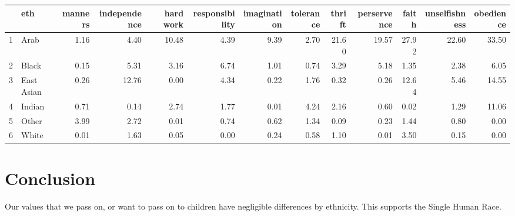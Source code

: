 \documentclass{amsart}
\begin{document}
\begin{landscape}
\begin{table}[ht]
\centering
\begin{tabular}{rlrrrrrrrrrrr}
  \hline
 & eth & manners & independence & hard work & responsibility & imagination & tolerance & thrift & perservence & faith & unselfishness & obedience \\ 
  \hline
1 & Arab & 1.16 & 4.40 & 10.48 & 4.39 & 9.39 & 2.70 & 21.60 & 19.57 & 27.92 & 22.60 & 33.50 \\ 
  2 & Black & 0.15 & 5.31 & 3.16 & 6.74 & 1.01 & 0.74 & 3.29 & 5.18 & 1.35 & 2.38 & 6.05 \\ 
  3 & East Asian & 0.26 & 12.76 & 0.00 & 4.34 & 0.22 & 1.76 & 0.32 & 0.26 & 12.64 & 5.46 & 14.55 \\ 
  4 & Indian & 0.71 & 0.14 & 2.74 & 1.77 & 0.01 & 4.24 & 2.16 & 0.60 & 0.02 & 1.29 & 11.06 \\ 
  5 & Other & 3.99 & 2.72 & 0.01 & 0.74 & 0.62 & 1.34 & 0.09 & 0.23 & 1.44 & 0.80 & 0.00 \\ 
  6 & White & 0.01 & 1.63 & 0.05 & 0.00 & 0.24 & 0.58 & 1.10 & 0.01 & 3.50 & 0.15 & 0.00 \\ 
   \hline
\end{tabular}
\end{table}
\end{landscape}

\section{Conclusion}
Our values that we pass on, or want to pass on to children have negligible differences by ethnicity.  This supports the Single Human Race.
\end{document}
